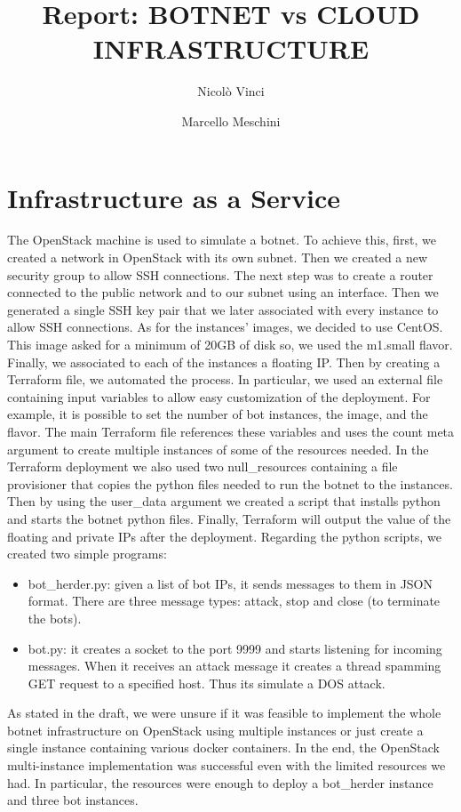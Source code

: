 \documentclass[a4paper]{article}
\title{Report: BOTNET vs CLOUD INFRASTRUCTURE}
\author{Nicolò Vinci  \\
	\and 
	Marcello Meschini \\
	}
\date{}
\begin{document}
\maketitle

\section{Infrastructure as a Service}
\label{iaas}
The OpenStack machine is used to simulate a botnet. To achieve this, first, we created a network in OpenStack with its own subnet. Then we created a new security group to allow SSH connections. The next step was to create a router connected to the public network and to our subnet using an interface. Then we generated a single SSH key pair that we later associated with every instance to allow SSH connections.  As for the instances' images, we decided to use CentOS. This image asked for a minimum of 20GB of disk so, we used the m1.small flavor. Finally, we associated to each of the instances a floating IP. Then by creating a Terraform file, we automated the process. In particular, we used an external file containing input variables to allow easy customization of the deployment. For example, it is possible to set the number of bot instances, the image, and the flavor. The main Terraform file references these variables and uses the count meta argument to create multiple instances of some of the resources needed. 
In the Terraform deployment we also used two null\_resources containing a file provisioner that copies the python files needed to run the botnet to the instances. Then by using the user\_data argument we created a script that installs python and starts the botnet python files. Finally, Terraform will output the value of the floating and private IPs after the deployment.
Regarding the python scripts, we created two simple programs:
\begin{itemize}
\item bot\_herder.py: given a list of bot IPs, it sends messages to them in JSON format. There are three message types: attack, stop and close (to terminate the bots).
\item bot.py: it creates a socket to the port 9999 and starts listening for incoming messages. When it receives an attack message it creates a thread spamming GET request to a specified host. Thus its simulate a DOS attack.
\end{itemize}

As stated in the draft, we were unsure if it was feasible to implement the whole botnet infrastructure on OpenStack using multiple instances or just create a single instance containing various docker containers. In the end, the OpenStack multi-instance implementation was successful even with the limited resources we had. In particular, the resources were enough to deploy a bot\_herder instance and three bot instances.
\end{document}
